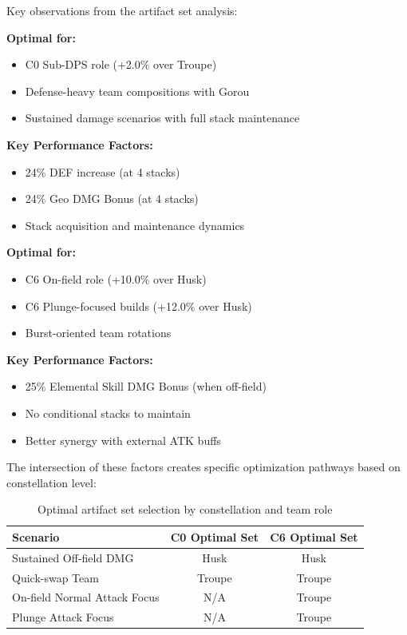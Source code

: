 \documentclass[12pt,a4paper]{article}
\begin{document}
Key observations from the artifact set analysis:

\begin{tcolorbox}[colback=huskcolor!5, colframe=huskcolor, title=Husk of Opulent Dreams (4pc)]
\textbf{Optimal for:}
\begin{itemize}
    \item C0 Sub-DPS role (+2.0\% over Troupe)
    \item Defense-heavy team compositions with Gorou
    \item Sustained damage scenarios with full stack maintenance
\end{itemize}

\textbf{Key Performance Factors:}
\begin{itemize}
    \item 24\% DEF increase (at 4 stacks)
    \item 24\% Geo DMG Bonus (at 4 stacks)
    \item Stack acquisition and maintenance dynamics
\end{itemize}
\end{tcolorbox}

\begin{tcolorbox}[colback=troupecolor!5, colframe=troupecolor, title=Golden Troupe (4pc)]
\textbf{Optimal for:}
\begin{itemize}
    \item C6 On-field role (+10.0\% over Husk)
    \item C6 Plunge-focused builds (+12.0\% over Husk)
    \item Burst-oriented team rotations
\end{itemize}

\textbf{Key Performance Factors:}
\begin{itemize}
    \item 25\% Elemental Skill DMG Bonus (when off-field)
    \item No conditional stacks to maintain
    \item Better synergy with external ATK buffs
\end{itemize}
\end{tcolorbox}

The intersection of these factors creates specific optimization pathways based on constellation level:

\begin{table}[h]
\centering
\begin{tabular}{lcc}
\toprule
\textbf{Scenario} & \textbf{C0 Optimal Set} & \textbf{C6 Optimal Set} \\
\midrule
Sustained Off-field DMG & Husk & Husk \\
Quick-swap Team & Troupe & Troupe \\
On-field Normal Attack Focus & N/A & Troupe \\
Plunge Attack Focus & N/A & Troupe \\
\bottomrule
\end{tabular}
\caption{Optimal artifact set selection by constellation and team role}
\label{tab:artifact_selection}
\end{table}
\end{document}
